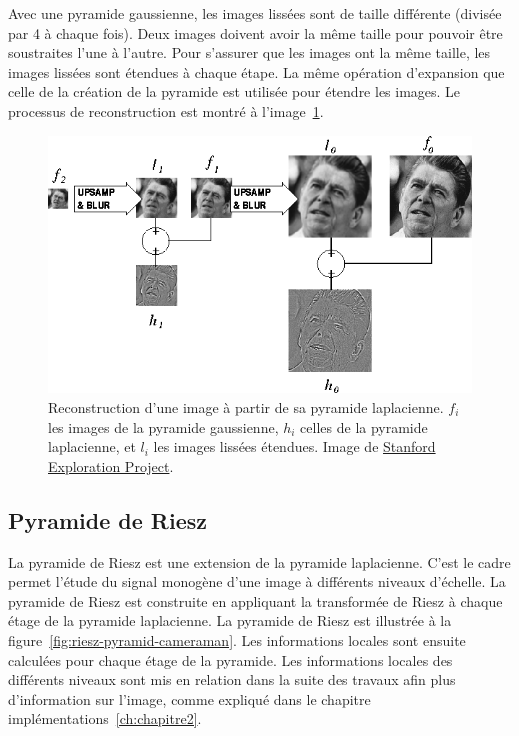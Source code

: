\bigskip

Avec une pyramide gaussienne, les images lissées sont de taille différente (divisée par 4 à chaque fois). Deux images doivent avoir la même taille pour pouvoir être soustraites l'une à l'autre. Pour s'assurer que les images ont la même taille, les images lissées sont étendues à chaque étape. La même opération d'expansion que celle de la création de la pyramide est utilisée pour étendre les images. Le processus de reconstruction est montré à l'image~\ref{fig:laplace-reconstruction}.

\begin{figure}
    \centering
    \includegraphics[width=.85\textwidth]{contenu/resources/images/laplacian_pyramid_reconstruction}
    \caption[Reconstruction d'une image à partir de sa pyramide laplacienne]{Reconstruction d'une image à partir de sa pyramide laplacienne. $f_i$ les images de la pyramide gaussienne, $h_i$ celles de la pyramide laplacienne, et $l_i$ les images lissées étendues. Image de \href{https://web.archive.org/web/20230203082428/http://sepwww.stanford.edu/data/media/public/sep/morgan/texturematch/paper_html/node3.html}{Stanford Exploration Project}.}
    \label{fig:laplace-reconstruction}
\end{figure}

\subsection{Pyramide de Riesz}

La pyramide de Riesz est une extension de la pyramide laplacienne. C'est le cadre permet l'étude du signal monogène d'une image à différents niveaux d'échelle. La pyramide de Riesz est construite en appliquant la transformée de Riesz à chaque étage de la pyramide laplacienne. La pyramide de Riesz est illustrée à la figure~\ref{fig:riesz-pyramid-cameraman}. Les informations locales sont ensuite calculées pour chaque étage de la pyramide. Les informations locales des différents niveaux sont mis en relation dans la suite des travaux afin plus d'information sur l'image, comme expliqué dans le chapitre implémentations~\ref{ch:chapitre2}.

